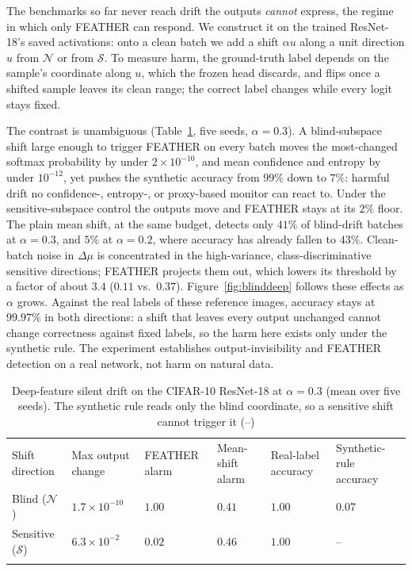 \documentclass[graybox]{SNmult}
\begin{document}
The benchmarks so far never reach drift the outputs \emph{cannot} express,
the regime in which only FEATHER can respond. We construct it on the trained
ResNet-18's saved activations: onto a clean batch we add a shift $\alpha u$
along a unit direction $u$ from $\mathcal{N}$ or from $\mathcal{S}$. To
measure harm, the ground-truth label depends on the sample's coordinate
along $u$, which the frozen head discards, and flips once a shifted sample
leaves its clean range; the correct label changes while every logit stays
fixed.

The contrast is unambiguous (Table~\ref{tab:blinddeep}, five seeds,
$\alpha=0.3$). A blind-subspace shift large enough to trigger FEATHER on every
batch moves the most-changed softmax probability by under $2\times10^{-10}$,
and mean confidence and entropy by under $10^{-12}$, yet pushes the synthetic
accuracy from $99\%$ down to $7\%$: harmful drift no confidence-, entropy-, or
proxy-based monitor can react to. Under the sensitive-subspace control the
outputs move and FEATHER stays at its $2\%$ floor. The plain mean shift, at the same budget, detects only $41\%$ of
blind-drift batches at $\alpha=0.3$, and $5\%$ at $\alpha=0.2$, where accuracy
has already fallen to $43\%$. Clean-batch noise in $\Delta\mu$ is concentrated
in the high-variance, class-discriminative sensitive directions; FEATHER
projects them out, which lowers its threshold by a factor of about $3.4$
($0.11$ vs.\ $0.37$). Figure~\ref{fig:blinddeep} follows these effects as
$\alpha$ grows.
Against the real labels of these reference images, accuracy stays at
$99.97\%$ in both directions: a shift that leaves every output unchanged cannot change
correctness against fixed labels, so the harm here exists only under the
synthetic rule. The experiment establishes output-invisibility and FEATHER
detection on a real network, not harm on natural data.

\begin{table}[!t]
\caption{Deep-feature silent drift on the CIFAR-10 ResNet-18 at $\alpha=0.3$
(mean over five seeds). The synthetic rule reads only the blind coordinate, so
a sensitive shift cannot trigger it (--)}
\label{tab:blinddeep}
\setlength{\tabcolsep}{3pt}
\begin{tabular}{p{1.8cm}p{1.9cm}p{1.4cm}p{1.6cm}p{1.6cm}p{1.8cm}}
\hline\noalign{\smallskip}
Shift direction & Max output change & FEATHER alarm & Mean-shift alarm & Real-label accuracy & Synthetic-rule accuracy \\
\noalign{\smallskip}\svhline\noalign{\smallskip}
Blind ($\mathcal{N}$) & $1.7\times10^{-10}$ & $\mathbf{1.00}$ & $0.41$ & $1.00$ & $0.07$ \\
Sensitive ($\mathcal{S}$) & $6.3\times10^{-2}$ & $0.02$ & $0.46$ & $1.00$ & -- \\
\noalign{\smallskip}\hline\noalign{\smallskip}
\end{tabular}
\end{table}
\end{document}
